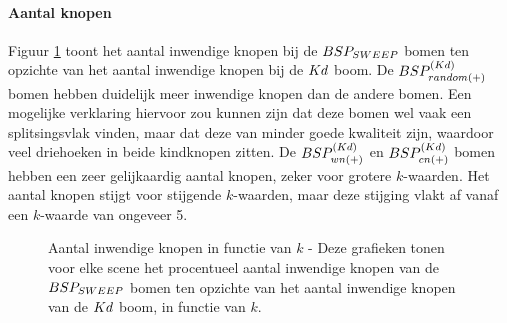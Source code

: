 \paragraph{Aantal knopen} Figuur \ref{fig:k-knopen} toont het aantal inwendige knopen bij de $BSP_{SWEEP}$ bomen ten opzichte van het aantal inwendige knopen bij de $Kd$ boom. De $BSP^{(Kd)}_{random(+)}$ bomen hebben duidelijk meer inwendige knopen dan de andere bomen. Een mogelijke verklaring hiervoor zou kunnen zijn dat deze bomen wel vaak een splitsingsvlak vinden, maar dat deze van minder goede kwaliteit zijn, waardoor veel driehoeken in beide kindknopen zitten. De $BSP^{(Kd)}_{wn(+)}$ en $BSP^{(Kd)}_{cn(+)}$ bomen hebben een zeer gelijkaardig aantal knopen, zeker voor grotere $k$-waarden. Het aantal knopen stijgt voor stijgende $k$-waarden, maar deze stijging vlakt af vanaf een $k$-waarde van ongeveer 5.
\begin{figure}[h]
  \centering
  \begin{subfigure}[t]{.32\linewidth}
    \centering
{}
  \end{subfigure}
  \begin{subfigure}[t]{.32\linewidth}
    \centering
{}
\end{subfigure}
\begin{subfigure}[t]{.32\linewidth}
  \centering
{}
\end{subfigure}
\caption[Aantal inwendige knopen in functie van $k$]{Aantal inwendige knopen in functie van $k$ - \small Deze grafieken tonen voor elke scene het procentueel aantal inwendige knopen van de $BSP_{SWEEP}$ bomen ten opzichte van het aantal inwendige knopen van de $Kd$ boom, in functie van $k$.}
\label{fig:k-knopen}
\end{figure}
